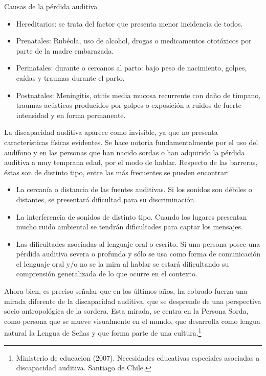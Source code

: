 \documentclass[12pt]{report}%
\begin{document}
Causas de la pérdida auditiva
\begin{itemize}
\item Hereditarios: se trata del factor que presenta menor incidencia de todos.
\item Prenatales: Rubéola, uso de alcohol, drogas o medicamentos ototóxicos por parte de
la madre embarazada.
\item Perinatales: durante o cercanos al parto: bajo peso de nacimiento, golpes, caídas y
traumas durante el parto.
\item Postnatales: Meningitis, otitis media mucosa recurrente con daño de tímpano,
traumas acústicos producidos por golpes o exposición a ruidos de fuerte intensidad
y en forma permanente.
\end{itemize}

La discapacidad auditiva aparece como invisible, ya que no presenta características físicas evidentes. Se hace notoria fundamentalmente por el uso del audífono y en las personas que han nacido sordas o han adquirido la pérdida auditiva a muy temprana edad, por el modo de hablar.
Respecto de las barreras, éstas son de distinto tipo, entre las más frecuentes se pueden encontrar: 
\begin{itemize}
\item La cercanía o distancia de las fuentes auditivas. Si los sonidos son débiles o distantes, se presentará dificultad para su discriminación. 
\item La interferencia de sonidos de distinto tipo. Cuando los lugares presentan mucho ruido ambiental se tendrán dificultades para captar los mensajes.
\item Las dificultades asociadas al lenguaje oral o escrito. Si una persona posee una pérdida auditiva severa o profunda y sólo se usa como forma de comunicación el lenguaje oral y/o no se la mira al hablar se estará dificultando su comprensión generalizada de lo que ocurre en el contexto.
\end{itemize}

Ahora bien, es preciso señalar que en los últimos años, ha cobrado fuerza una mirada diferente de la discapacidad auditiva, que se desprende de una perspectiva socio antropológica de la sordera. Esta mirada, se centra en la Persona Sorda, como persona que se mueve visualmente en el mundo, que desarrolla como lengua natural la Lengua de Señas y que forma parte de una cultura.\footnote{Ministerio de educacion (2007). Necesidades educativas especiales asociadas a discapacidad auditiva. Santiago de Chile.}
\end{document}
